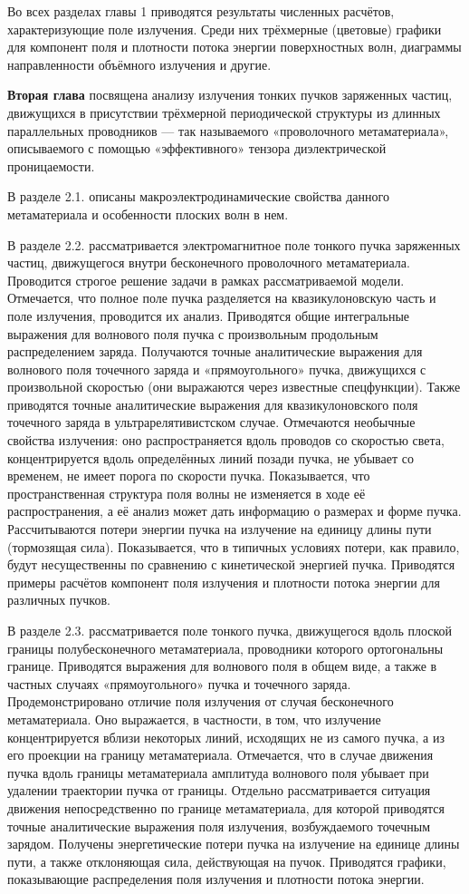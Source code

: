 Во всех разделах главы 1 приводятся результаты численных расчётов, характеризующие поле излучения. Среди них трёхмерные (цветовые) графики для компонент поля и плотности потока энергии поверхностных волн, диаграммы направленности объёмного излучения и другие.

\textbf{Вторая глава} посвящена анализу излучения тонких пучков заряженных частиц, движущихся в присутствии трёхмерной периодической структуры из длинных параллельных проводников — так называемого «проволочного метаматериала», описываемого с помощью «эффективного» тензора диэлектрической проницаемости.

В разделе 2.1. описаны макроэлектродинамические свойства данного метаматериала и особенности плоских волн в нем.

В разделе 2.2. рассматривается электромагнитное поле тонкого пучка заряженных частиц, движущегося внутри бесконечного проволочного метаматериала. Проводится строгое решение задачи в рамках рассматриваемой модели. Отмечается, что полное поле пучка разделяется на квазикулоновскую часть и поле излучения, проводится их анализ. Приводятся общие интегральные выражения для волнового поля пучка с произвольным продольным распределением заряда. Получаются точные аналитические выражения для волнового поля точечного заряда и «прямоугольного» пучка, движущихся с произвольной скоростью (они выражаются через известные спецфункции). Также приводятся точные аналитические выражения для квазикулоновского поля точечного заряда в ультрарелятивистском случае. Отмечаются необычные свойства излучения: оно распространяется вдоль проводов со скоростью света, концентрируется вдоль определённых линий позади пучка, не убывает со временем, не имеет порога по скорости пучка. Показывается, что пространственная структура поля волны не изменяется в ходе её распространения, а её анализ может дать информацию о размерах и форме пучка. Рассчитываются потери энергии пучка на излучение на единицу длины пути (тормозящая сила). Показывается, что в типичных условиях потери, как правило, будут несущественны по сравнению с кинетической энергией пучка. Приводятся примеры расчётов компонент поля излучения и плотности потока энергии для различных пучков.

В разделе 2.3. рассматривается поле тонкого пучка, движущегося вдоль плоской границы полубесконечного метаматериала, проводники которого ортогональны границе. Приводятся выражения для волнового поля в общем виде, а также в частных случаях «прямоугольного» пучка и точечного заряда. Продемонстрировано отличие поля излучения от случая бесконечного метаматериала. Оно выражается, в частности, в том, что излучение концентрируется вблизи некоторых линий, исходящих не из самого пучка, а из его проекции на границу метаматериала. Отмечается, что в случае движения пучка вдоль границы метаматериала амплитуда волнового поля убывает при удалении траектории пучка от границы. Отдельно рассматривается ситуация движения непосредственно по границе метаматериала, для которой приводятся точные аналитические выражения поля излучения, возбуждаемого точечным зарядом. Получены энергетические потери пучка на излучение на единице длины пути, а также отклоняющая сила, действующая на пучок. Приводятся графики, показывающие распределения поля излучения и плотности потока энергии.

